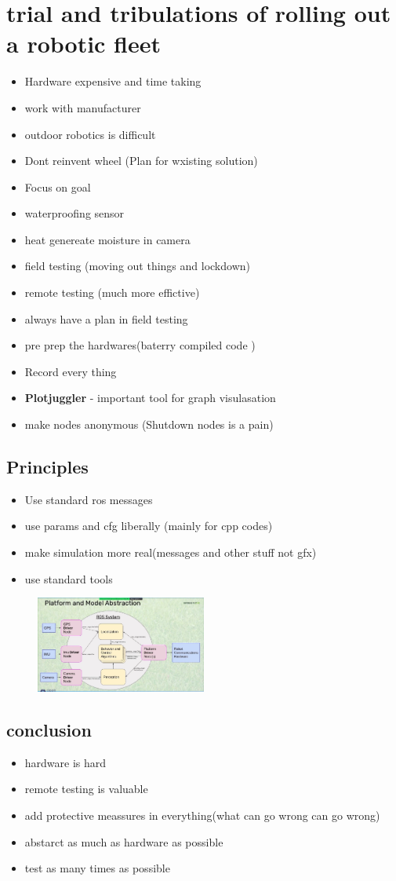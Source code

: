 \documentclass[a4paper]{article}
\begin{document}
\section{trial and tribulations of rolling out a robotic fleet}
\begin{itemize}
	\item Hardware expensive and time taking
	\item work with manufacturer
	\item outdoor robotics is difficult
	\item Dont reinvent wheel (Plan for wxisting solution)
	\item Focus on goal
	\item waterproofing sensor
	\item heat genereate moisture in camera
	\item field testing (moving out things and lockdown)
	\item remote testing (much more effictive)
	\item always have a plan in field testing
	\item pre prep the hardwares(baterry compiled code )
	\item Record every thing
	\item \textbf{Plotjuggler} - important tool for graph visulasation
	\item make nodes anonymous (Shutdown nodes is a pain)
\end{itemize}
\subsection{Principles}
\begin{itemize}
	\item Use standard ros messages
    \item use params and cfg liberally (mainly for cpp codes) 
    \item make simulation more real(messages and other stuff not gfx)
    \item use standard tools 
\end{itemize}
\begin{figure}[htpb]
	\centering
	\includegraphics[width=0.5\textwidth]{platform_abstraction.png}
	\caption{}
	\label{fig:}
\end{figure}
\subsection{conclusion}
\begin{itemize}
    \item hardware is hard 
    \item remote testing is valuable
    \item add protective meassures in everything(what can go wrong can go wrong)
    \item abstarct as much as hardware as possible
    \item test as many times as possible
\end{itemize}
\end{document}
